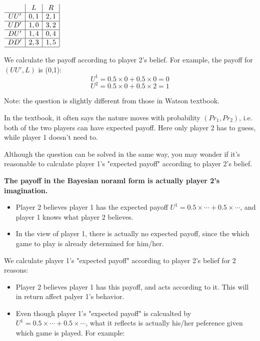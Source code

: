 \documentclass{article}
\begin{document}
\begin{center}
$
\begin{array}{c|c|c|}
 & L & R \\
\hline
UU' & 0,1 & 2,1 \\
\hline
UD' & 1,0 & 3,2 \\
\hline
DU' & 1,4 & 0,4 \\
\hline
DD' & 2,3 & 1,5 \\
\hline
\end{array}
$
\end{center}
%

\begin{mdframed}[backgroundcolor=blue!20,linecolor=white]

We calculate the payoff according to player 2's belief. For example, the 
payoff for $(UU',L)$ is (0,1):
$$U^1= 0.5 \times 0 +  0.5 \times 0 =0$$
$$U^2= 0.5 \times 0 +  0.5 \times 2 =1$$


Note: the question is slightly different from those in Watson textbook.
\medskip

In the textbook, it often says
the nature moves with probability $(Pr_1,Pr_2)$, i.e. both of the two players can have expected payoff.
Here only player 2 has to guess, while player 1 doesn't need to. 
\medskip

Although the question can be solved in the same way, you may wonder if it's reasonable to calculate player 1's "expected payoff" according to player 2's belief.

\medskip

\textbf{The payoff in the Bayesian noraml form is actually player 2's imagination.}

\begin{itemize}
\item Player 2 believes player 1 has the expected payoff $U^1 = 0.5 \times \cdots + 0.5 \times \cdots$, and player 1 knows what player 2 believes.
\item In the view of player 1, there is actually no expected payoff, since the which game to play is already determined for him/her.
\end{itemize}


We calculate player 1's "expected payoff" according to player 2's belief for 2 reasons:

\begin{itemize}
\item Player 2 believes player 1 has this payoff, and acts according to it. This will in return affect palyer 1's behavior.
\item Even though player 1's "expected payoff" is calcualted by $U^1 = 0.5 \times \cdots + 0.5 \times \cdots$, what it reflects is actually his/her peference given which game is played. For example:


\end{itemize}
\end{mdframed}
\end{document}
